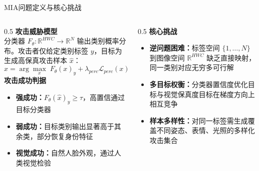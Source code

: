 \documentclass[aspectratio=169,12pt]{beamer}
\renewcommand{\textbf}[1]{\textcolor{hitblue}{\bfseries #1}}
\newcommand{\important}[1]{\textcolor{hitgray}{\textbf{#1}}}
\begin{document}
\begin{frame}{MIA问题定义与核心挑战}
\footnotesize
\begin{columns}[T]
\begin{column}{0.5\textwidth}
\textbf{攻击威胁模型}\\[2pt]
分类器 $F_\theta\!:\!\mathbb{R}^{HWC}\!\to\!\mathbb{R}^N$ 输出类别概率分布。攻击者仅给定类别标签 $y$，目标为生成高保真攻击样本 $\hat{x}$：
\vspace{-4pt}
{\scriptsize\begin{equation*}
\hat{x}=\arg\max_x\;F_\theta(x)_y+\lambda_{perc}\mathcal{L}_{perc}(x)-\lambda_{reg}R(x),\;\hat{x}\!\in\!\mathcal{M}_{nat}
\end{equation*}}\vspace{-4pt}
\textbf{攻击成功判据}
\begin{itemize}\setlength{\itemsep}{1pt}
  \item \important{强成功：}$F_\theta(\hat{x})_y\geq\tau$，高置信通过目标分类器
  \item \important{弱成功：}目标类别输出显著高于其余类，部分恢复身份特征
  \item \important{视觉成功：}自然人脸外观，通过人类视觉检验
\end{itemize}
\end{column}
\begin{column}{0.5\textwidth}
\textbf{核心挑战}
\begin{itemize}\setlength{\itemsep}{2pt}
  \item \important{逆问题困难：}标签空间 $\{1,\ldots,N\}$ 到图像空间 $\mathbb{R}^{HWC}$ 缺乏直接映射，同一类别对应无穷多可行解
  \item \important{多目标权衡：}分类器置信度优化目标与视觉保真度目标在梯度方向上相互竞争
  \item \important{样本多样性：}对同一标签需生成覆盖不同姿态、表情、光照的多样化攻击集合
\end{itemize}
\end{column}
\end{columns}
\end{frame} %
\end{document}
